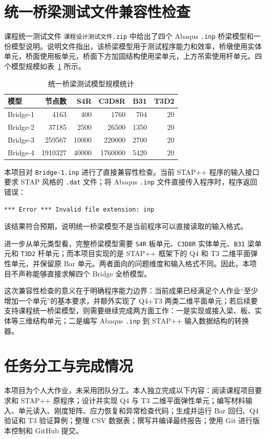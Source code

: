 ﻿\documentclass[UTF8,11pt,a4paper]{ctexart}
\begin{document}
\section{统一桥梁测试文件兼容性检查}
课程统一测试文件 \texttt{课程设计测试文件.zip} 中给出了四个 Abaqus \texttt{.inp} 桥梁模型和一份模型说明。说明文件指出，该桥梁模型用于测试程序能力和效率，桥墩使用实体单元，桥面使用板单元，桥面下方加固结构使用梁单元，上方吊索使用杆单元。四个模型规模如表~\ref{tab:bridge-models} 所示。

\begin{table}[H]
\centering
\caption{统一桥梁测试模型规模统计}\label{tab:bridge-models}
\small
\begin{tabular}{lrrrrr}
\toprule
模型 & 节点数 & S4R & C3D8R & B31 & T3D2 \\
\midrule
Bridge-1 & 4163 & 400 & 1760 & 704 & 20 \\
Bridge-2 & 37185 & 2500 & 26500 & 1350 & 20 \\
Bridge-3 & 259567 & 10000 & 220000 & 2700 & 20 \\
Bridge-4 & 1910327 & 40000 & 1760000 & 5420 & 20 \\
\bottomrule
\end{tabular}
\end{table}

本项目对 \texttt{Bridge-1.inp} 进行了直接兼容性检查。当前 STAP++ 程序的输入接口要求 STAP 风格的 \texttt{.dat} 文件；将 Abaqus \texttt{.inp} 文件直接传入程序时，程序返回错误：
\begin{lstlisting}
*** Error *** Invalid file extension: inp
\end{lstlisting}
该结果符合预期，说明统一桥梁模型不是当前程序可以直接读取的输入格式。

进一步从单元类型看，完整桥梁模型需要 \texttt{S4R} 板单元、\texttt{C3D8R} 实体单元、\texttt{B31} 梁单元和 \texttt{T3D2} 杆单元；而本项目实现的是 STAP++ 框架下的 Q4 和 T3 二维平面弹性单元，并保留原 Bar 单元。两者面向的问题维度和输入格式不同。因此，本项目不声称能够直接求解四个 Bridge 全桥模型。

这次兼容性检查的意义在于明确程序能力边界：当前成果已经满足个人作业“至少增加一个单元”的基本要求，并额外实现了 Q4+T3 两类二维平面单元；若后续要支持课程统一桥梁模型，则需要继续完成两方面工作：一是实现或接入梁、板、实体等三维结构单元；二是编写 Abaqus \texttt{.inp} 到 STAP++ 输入数据结构的转换器。

\section{任务分工与完成情况}
本项目为个人大作业，未采用团队分工。本人独立完成以下内容：阅读课程项目要求和 STAP++ 原程序；设计并实现 Q4 与 T3 二维平面弹性单元；编写材料输入、单元读入、刚度矩阵、应力恢复和异常检查代码；生成并运行 Bar 回归、Q4 验证和 T3 验证算例；整理 CSV 数据表；撰写并编译最终报告；使用 Git 进行版本控制和 GitHub 提交。
\end{document}
